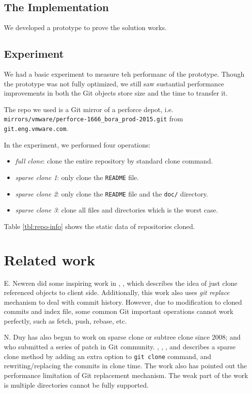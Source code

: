 \documentclass[preprint]{sigplanconf}
\begin{document}
\subsection{The Implementation}
We developed a prototype to prove the solution works.

\subsection{Experiment}
We had a basic experiment to measure teh performanc of the prototype.
Though the prototype was not fully optimized, we still saw sustantial
performance improvements in both the Git objects store size and the time to
transfer it.

The repo we used is a Git mirror of a perforce depot, i.e.
\verb|mirrors/vmware/perforce-1666_bora_prod-2015.git| from
\verb|git.eng.vmware.com|.

In the experiment, we performed four operations:
\begin{itemize}
  \item \emph{full clone}: clone the entire repository by standard clone
    command.
  \item \emph{sparse clone 1}: only clone the \verb|README| file.
  \item \emph{sparse clone 2}: only clone the \verb|README| file and the
  \verb|doc/| directory.
  \item \emph{sparse clone 3}: clone all files and directories which is the
    worst case.
\end{itemize}
Table \ref{tbl:repo-info} shows the static data of repositories cloned.



\section{Related work}
E. Newren did some inspiring work in \cite{newren10-0}, \cite{newren10-1},
which describes the idea of just clone referenced objects to client side.
Additionally, this work also uses \emph{git replace} mechanism to deal with
commit history.
However, due to modification to cloned commits and index file, some common Git
important operations cannot work perfectly, such as fetch, push, rebase, etc.

N. Duy has also begun to work on sparse clone or subtree clone since 2008; and
who submitted a series of patch in Git community.
\cite{duy08}, \cite{duy10-1}, \cite{duy10-2}, and \cite{duy10-3} describes a
sparse clone method by adding an extra option to \verb|git clone| command, and
rewriting/replacing the commits in clone time.
The work also has pointed out the performance limitation of Git replacement
mechanism.
The weak part of the work is multiple directories cannot be fully supported.
\end{document}
